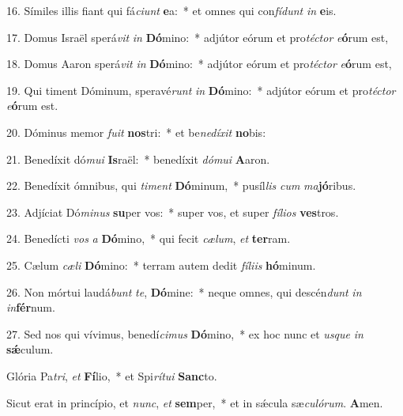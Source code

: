 \begin{latinenglishsection}
{	 16. Símiles illis fiant qui fá\textit{ci}\textit{unt} \textbf{e}a:~*
		et omnes qui con\textit{fí}\textit{dunt} \textit{in} \textbf{e}is.
	
	 17. Domus Israël sperá\textit{vit} \textit{in} \textbf{Dó}mino:~*
		adjútor eórum et pro\textit{téc}\textit{tor} \textit{e}\textbf{ó}rum est,
	
	 18. Domus Aaron sperá\textit{vit} \textit{in} \textbf{Dó}mino:~*
		adjútor eórum et pro\textit{téc}\textit{tor} \textit{e}\textbf{ó}rum est,
	
	 19. Qui timent Dóminum, speravé\textit{runt} \textit{in} \textbf{Dó}mino:~*
		adjútor eórum et pro\textit{téc}\textit{tor} \textit{e}\textbf{ó}rum est.
	
	 20. Dóminus memor \textit{fu}\textit{it} \textbf{nos}tri:~*
		et be\textit{ne}\textit{dí}\textit{xit} \textbf{no}bis:
	
	 21. Benedíxit dó\textit{mu}\textit{i} \textbf{Is}raël:~*
		benedíxit \textit{dó}\textit{mu}\textit{i} \textbf{A}aron.
	
	 22. Benedíxit ómnibus, qui \textit{ti}\textit{ment} \textbf{Dó}minum,~*
		pusíl\textit{lis} \textit{cum} \textit{ma}\textbf{jó}ribus.
	
	 23. Adjíciat Dó\textit{mi}\textit{nus} \textbf{su}per vos:~*
		super vos, et super \textit{fí}\textit{li}\textit{os} \textbf{ves}tros.
	
	 24. Benedícti \textit{vos} \textit{a} \textbf{Dó}mino,~*
		qui fecit \textit{cæ}\textit{lum}, \textit{et} \textbf{ter}ram.
	
	 25. Cælum \textit{cæ}\textit{li} \textbf{Dó}mino:~*
		terram autem dedit \textit{fí}\textit{li}\textit{is} \textbf{hó}minum.
	
	 26. Non mórtui laudá\textit{bunt} \textit{te}, \textbf{Dó}mine:~*
		neque omnes, qui descén\textit{dunt} \textit{in} \textit{in}\textbf{fér}num.
	
	 27. Sed nos qui vívimus, benedí\textit{ci}\textit{mus} \textbf{Dó}mino,~*
		ex hoc nunc et \textit{us}\textit{que} \textit{in} \textbf{s\'{\ae}}culum.
	
	 Glória Pa\textit{tri}, \textit{et} \textbf{Fí}lio,~*
		et Spi\textit{rí}\textit{tu}\textit{i} \textbf{Sanc}to.
	
	 Sicut erat in princípio, et \textit{nunc}, \textit{et} \textbf{sem}per,~*
		et in s\'{\ae}cula sæ\textit{cu}\textit{ló}\textit{rum}. \textbf{A}men.
}{
	
}

\end{latinenglishsection}